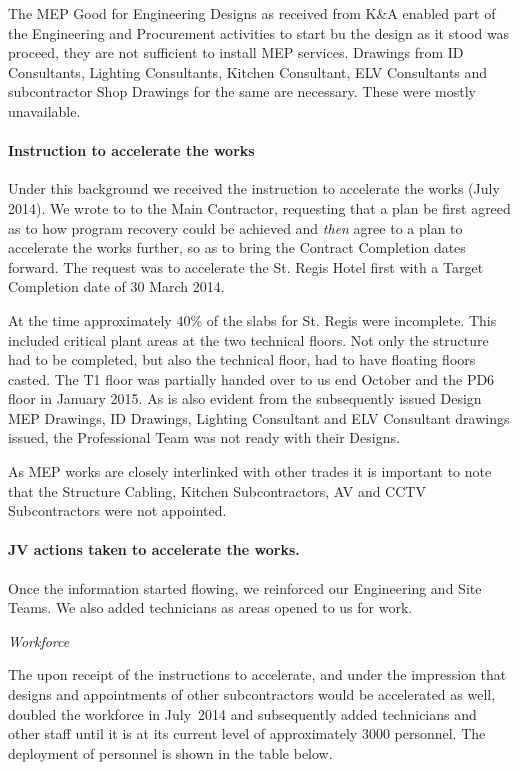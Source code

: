 The MEP Good for Engineering Designs as received from K\&A enabled part of the Engineering and Procurement activities to start bu the design as it stood was  proceed, they are not sufficient to install MEP services. Drawings from ID Consultants, Lighting Consultants, Kitchen Consultant, ELV Consultants and subcontractor Shop Drawings for the same are necessary. These were mostly unavailable.

\paragraph{Instruction to accelerate the works}
Under this background we received the instruction to  accelerate the works (July 2014). We wrote to to the Main Contractor, requesting that a plan be first agreed as to how program recovery could be achieved and \emph{then} agree to a plan to accelerate the works further, so as to bring the Contract Completion dates forward. The request was to accelerate the St. Regis Hotel first with a Target Completion date of 30 March 2014.

At the time approximately 40\% of the slabs  for St. Regis were incomplete. This included critical plant areas at the two technical floors. Not only the structure had to be completed, but also the technical floor, had to have floating floors casted. The T1 floor was partially handed over to us end October and the PD6 floor in January 2015. As is also evident from the subsequently issued Design MEP Drawings, ID Drawings, Lighting Consultant and ELV Consultant drawings issued, the Professional Team was not ready with their Designs. 

As MEP works are closely interlinked with other trades it is important to note that the Structure Cabling, Kitchen Subcontractors, AV and CCTV Subcontractors were not appointed. 
\medskip

 
   


\label{acceleration}
\paragraph{JV actions taken to accelerate the works.} Once the information started flowing, we reinforced our Engineering and Site Teams. We also added technicians as areas opened to us for work.
\medskip

\noindent\textit{Workforce}
\medskip

\noindent The \JV upon receipt of the instructions to accelerate, and under the impression that designs and appointments of other subcontractors would be accelerated as well, doubled the workforce in July~2014 and subsequently added technicians and other staff until it is at its current level of approximately 3000 personnel. The deployment of personnel is shown in the table below.

